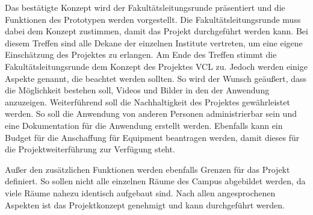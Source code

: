 Das bestätigte Konzept wird der Fakultätsleitungsrunde präsentiert und die Funktionen des
Prototypen werden vorgestellt.
Die Fakultätsleitungsrunde muss dabei dem Konzept 
zustimmen, damit das Projekt durchgeführt werden kann.
Bei diesem Treffen sind alle Dekane der einzelnen Institute vertreten, um eine eigene Einschätzung 
des Projektes zu erlangen.
Am Ende des Treffen stimmt die Fakultätsleitungsrunde dem Konzept des Projektes \acs{VCL} zu.
Jedoch werden einige Aspekte genannt, die beachtet werden sollten. So wird der Wunsch geäußert, 
dass die Möglichkeit bestehen soll, Videos und Bilder in den der Anwendung anzuzeigen.
Weiterführend soll die 
Nachhaltigkeit des Projektes gewährleistet werden. So soll die Anwendung von anderen Personen administrierbar sein und eine Dokumentation für die Anwendung erstellt werden. Ebenfalls kann ein Budget für die Anschaffung für Equipment 
beantragen werden, damit dieses für die Projektweiterführung zur Verfügung steht.

Außer den zusätzlichen Funktionen werden ebenfalls Grenzen für das Projekt definiert. 
So sollen nicht alle einzelnen Räume 
des Campus abgebildet werden, da viele Räume nahezu identisch aufgebaut sind. 
Nach allen angesprochenen Aspekten ist das Projektkonzept genehmigt und kann durchgeführt werden.